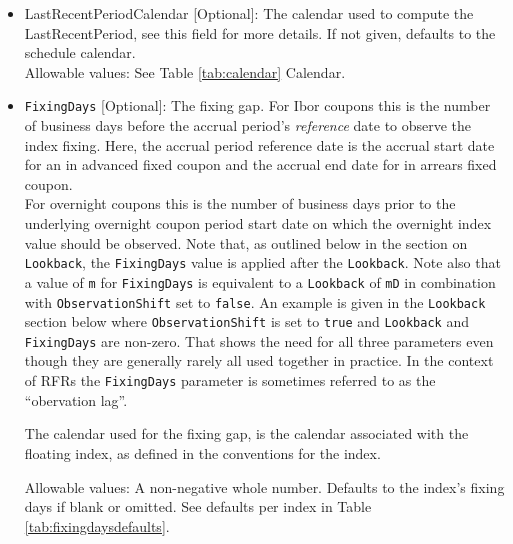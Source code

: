 \begin{itemize}
  Allowable values: any valid period, e.g. 30D, 90D, 180D, 1M, 2M, 6M

\item LastRecentPeriodCalendar [Optional]: The calendar used to compute the LastRecentPeriod, see this field for more
  details. If not given, defaults to the schedule calendar. \\

  Allowable values: See Table \ref{tab:calendar} Calendar.

\item \lstinline!FixingDays! [Optional]: The fixing gap. For Ibor coupons this is the number of business days 
  before the accrual period's {\em reference} date to observe the index fixing.
  Here, the accrual period reference date is the accrual start date for an in advanced fixed coupon and the 
  accrual end date for in arrears fixed coupon. \\
  
  For overnight coupons this is the number of business days prior to the underlying overnight coupon period start 
  date on which the overnight index value should be observed.
  Note that, as outlined below in the section on \lstinline!Lookback!, the \lstinline!FixingDays! value is applied 
  after the \lstinline!Lookback!.
  Note also that a value of \lstinline!m! for \lstinline!FixingDays! is equivalent to a \lstinline!Lookback! of 
  \lstinline!mD! in combination with \lstinline!ObservationShift! set to \lstinline!false!.
  An example is given in the \lstinline!Lookback! section below where \lstinline!ObservationShift! is set to 
  \lstinline!true! and \lstinline!Lookback! and \lstinline!FixingDays! are non-zero. That shows the need for all 
  three parameters even though they are generally rarely all used together in practice.
  In the context of RFRs the \lstinline!FixingDays! parameter is sometimes referred to as the ``obervation lag''.

  The calendar used for the fixing gap, is the calendar associated with the floating index, as defined in the 
  conventions for the index.

  Allowable values: A non-negative whole number. 
  Defaults to the index's fixing days if blank or omitted. See defaults per index in Table \ref{tab:fixingdaysdefaults}.


\end{itemize}
